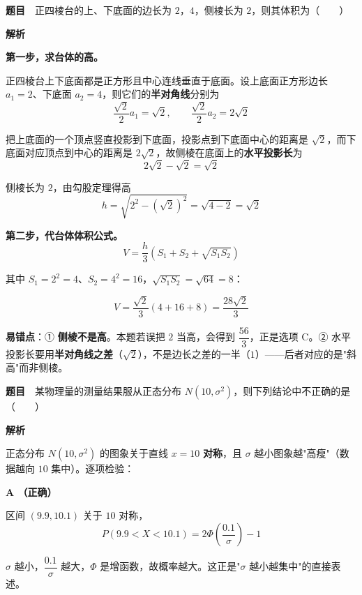 \textbf{题目}　正四棱台的上、下底面的边长为 $2$，$4$，侧棱长为 $2$，则其体积为（　　）

\textbf{解析}

\textbf{第一步，求台体的高。}

正四棱台上下底面都是正方形且中心连线垂直于底面。设上底面正方形边长 $a_1=2$、下底面 $a_2=4$，则它们的\textbf{半对角线}分别为
\[\frac{\sqrt2}2a_1=\sqrt2,\qquad \frac{\sqrt2}2a_2=2\sqrt2\]

把上底面的一个顶点竖直投影到下底面，投影点到下底面中心的距离是 $\sqrt2$，而下底面对应顶点到中心的距离是 $2\sqrt2$，故侧棱在底面上的\textbf{水平投影长}为
\[2\sqrt2-\sqrt2=\sqrt2\]

侧棱长为 $2$，由勾股定理得高
\[h=\sqrt{2^{2}-\left(\sqrt2\right)^{2}}=\sqrt{4-2}=\sqrt2\]

\textbf{第二步，代台体体积公式。}
\[V=\frac h3\left(S_1+S_2+\sqrt{S_1S_2}\right)\]

其中 $S_1=2^{2}=4$、$S_2=4^{2}=16$，$\sqrt{S_1S_2}=\sqrt{64}=8$：

\[V=\frac{\sqrt2}3\left(4+16+8\right)=\frac{28\sqrt2}3\]


\begin{gktip}
\textbf{易错点}：① \textbf{侧棱不是高}。本题若误把 $2$ 当高，会得到 $\dfrac{56}3$，正是选项 C。② 水平投影长要用\textbf{半对角线之差}（$\sqrt2$），不是边长之差的一半（$1$）——后者对应的是"斜高"而非侧棱。
\end{gktip}

\par\medskip


\textbf{题目}　某物理量的测量结果服从正态分布 $N\left(10,\sigma^{2}\right)$，则下列结论中不正确的是（　　）

\textbf{解析}

正态分布 $N\left(10,\sigma^{2}\right)$ 的图象关于直线 $x=10$ \textbf{对称}，且 $\sigma$ 越小图象越"高瘦"（数据越向 $10$ 集中）。逐项检验：

\par\medskip

\textbf{A （正确）}

区间 $(9.9,10.1)$ 关于 $10$ 对称，
\[P(9.9<X<10.1)=2\Phi\left(\frac{0.1}\sigma\right)-1\]

$\sigma$ 越小，$\dfrac{0.1}\sigma$ 越大，$\Phi$ 是增函数，故概率越大。这正是"$\sigma$ 越小越集中"的直接表述。

\par\medskip

